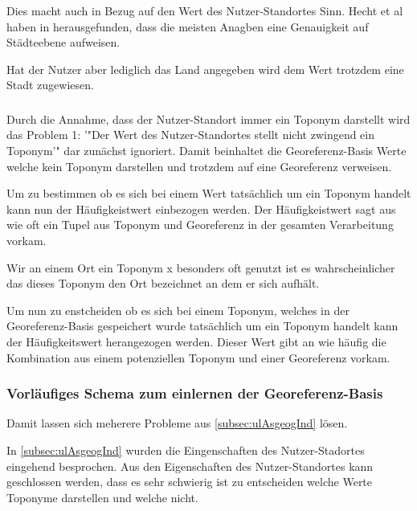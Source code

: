 						Dies macht auch in Bezug auf den Wert des Nutzer-Standortes Sinn. 
						Hecht et al haben in \cite{Hecht2011} herausgefunden, dass die meisten Anagben eine Genauigkeit auf Städteebene aufweisen.  
						
						Hat der Nutzer aber lediglich das Land angegeben wird dem Wert trotzdem eine Stadt zugewiesen.  


					\subsubsection{}

						Durch die Annahme, dass der Nutzer-Standort immer ein Toponym darstellt wird das Problem 1: '"Der Wert des Nutzer-Standortes stellt nicht zwingend ein Toponym'" dar zunächst ignoriert.
						Damit beinhaltet die Georeferenz-Basis Werte welche kein Toponym darstellen und trotzdem auf eine Georeferenz verweisen. 

						Um zu bestimmen ob es sich bei einem Wert tatsächlich um ein Toponym handelt kann nun der Häufigkeistwert einbezogen werden.
						Der Häufigkeistwert sagt aus wie oft ein Tupel aus Toponym und Georeferenz in der gesamten Verarbeitung vorkam.

						Wir an einem Ort ein Toponym x besonders oft genutzt ist es wahrscheinlicher das dieses Toponym den Ort bezeichnet an dem er sich aufhält. 



					Um nun zu enstcheiden ob es sich bei einem Toponym, welches in der Georeferenz-Basis gespeichert wurde tatsächlich um ein Toponym handelt kann der Häufigkeitswert herangezogen werden. 
					Dieser Wert gibt an wie häufig die Kombination aus einem potenziellen Toponym und einer Georeferenz vorkam.
					
 

					\subsubsection{Vorläufiges Schema zum einlernen der Georeferenz-Basis}

					Damit lassen sich meherere Probleme aus \ref{subsec:ulAsgeogInd} lösen.

					
 

					 





					

					In \ref{subsec:ulAsgeogInd} wurden die Eingenschaften des Nutzer-Stadortes eingehend besprochen. 
					Aus den Eigenschaften des Nutzer-Standortes kann geschlossen werden, dass es sehr schwierig ist zu entscheiden welche Werte Toponyme darstellen und welche nicht.



